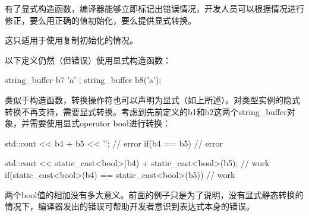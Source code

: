 有了显式构造函数，编译器能够立即标记出错误情况，开发人员可以根据情况进行修正，要么用正确的值初始化，要么提供显式转换。

\begin{myTip}
这只适用于使用复制初始化的情况。
\end{myTip}

以下定义仍然（但错误）使用显式构造函数：

\begin{cpp}
string_buffer b7{ 'a' };
string_buffer b8('a');
\end{cpp}

类似于构造函数，转换操作符也可以声明为显式（如上所述）。对类型实例的隐式转换不再支持，需要显式转换。考虑到先前定义的b1和b2这两个string\_buffer对象，并需要使用显式operator bool进行转换：

\begin{cpp}
std::cout << b4 + b5 << '\n'; // error
if(b4 == b5) {}               // error
\end{cpp}

\begin{cpp}
std::cout << static_cast<bool>(b4) + static_cast<bool>(b5); // work
if(static_cast<bool>(b4) == static_cast<bool>(b5)) {} // work
\end{cpp}

两个bool值的相加没有多大意义。前面的例子只是为了说明，没有显式静态转换的情况下，编译器发出的错误可帮助开发者意识到表达式本身的错误。









